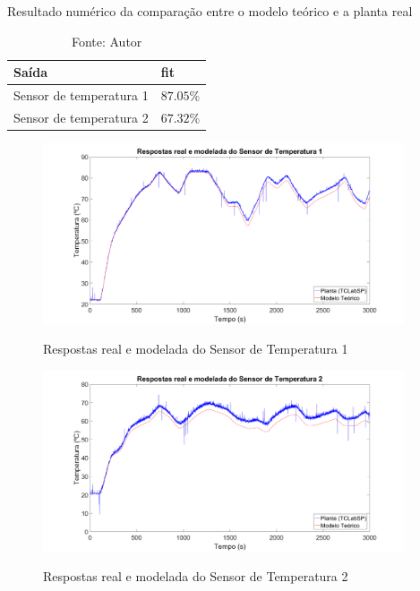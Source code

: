 \begin{table}[h]
	\centering
	\caption{Resultado numérico da comparação entre o modelo teórico e a planta real}
	\label{tab:ModeloTeorico_e_TCLabSP_results}
	\begin{tabular}{ll} \toprule
		{Saída}								& {fit}					\\ \midrule
		Sensor de temperatura 1				& $87.05\%$				\\
		Sensor de temperatura 2				& $67.32\%$				\\ \bottomrule
	\end{tabular}
	\caption*{Fonte: Autor}
\end{table}

\begin{figure}[h]
	\caption{Respostas real e modelada do Sensor de Temperatura 1}
	\begin{center}
		\includegraphics[width=0.95\textwidth]{./5_images/ModeloTeorico_e_TCLabSP_y1.png} 
		\label{fig:ModeloTeorico_e_TCLabSP_y1}
	\end{center}
	\centering
\end{figure}

\begin{figure}[h]
	\caption{Respostas real e modelada do Sensor de Temperatura 2}
	\begin{center}
		\includegraphics[width=0.95\textwidth]{./5_images/ModeloTeorico_e_TCLabSP_y2.png} 
		\label{fig:ModeloTeorico_e_TCLabSP_y2}
	\end{center}
	\centering
\end{figure}
